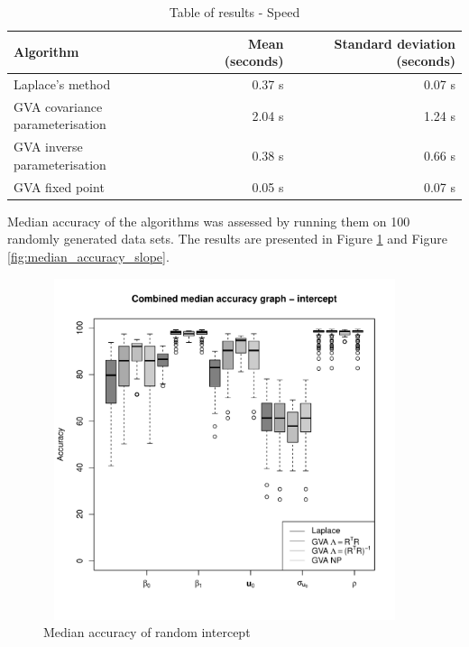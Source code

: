			\begin{table}
				\caption{Table of results - Speed}
				\label{tab:application_slope_speed}
				\begin{tabular}{|l|rr|}
					\hline
					Algorithm                            & Mean (seconds) & Standard deviation (seconds) \\
					\hline
					Laplace's method                     & 0.37 s         & 0.07 s                       \\
					GVA covariance parameterisation        & 2.04 s         & 1.24 s                       \\
					GVA inverse parameterisation & 0.38 s         & 0.66 s                       \\
					GVA fixed point                            & 0.05 s         & 0.07 s                       \\
					\hline
				\end{tabular}
			\end{table}

					
			Median accuracy of the algorithms was assessed by running them on 100 randomly generated data sets. The	results are presented in Figure \ref{fig:median_accuracy_intercept} and Figure
			\ref{fig:median_accuracy_slope}.
					
			\begin{figure}
				\begin{center}
					\includegraphics[width=0.95\textwidth, height=100mm]{code/results/median_accuracy_combined_intercept.pdf}
					\caption{Median accuracy of random intercept}
					\label{fig:median_accuracy_intercept}
				\end{center}
			\end{figure}
					
